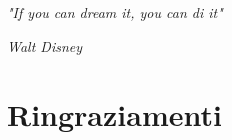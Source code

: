 \cleardoublepage



\bigskip

\begingroup

\let\clearpage\relax

\let\cleardoublepage\relax

\let\cleardoublepage\relax

\epigraph{\textit{"If you can dream it, you can di it"}}{\textit{Walt Disney}}

\chapter*{Ringraziamenti}

